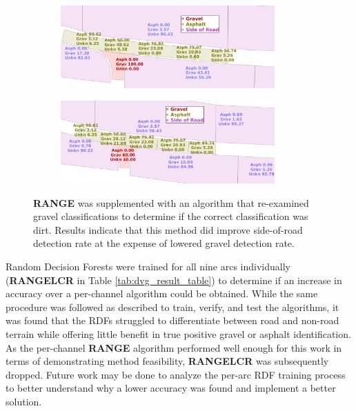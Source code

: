 \documentclass[numbered,pdftex]{ohio-etd}
\begin{document}
{{{%
		\begin{figure}[H]
			\centering
			\begin{subfigure}[b]{\textwidth}
				\centering
				\includegraphics[width=0.9\textwidth]{Defense_Images/range_actual_rm_db_4_area_score}
				\caption{}
				\label{fig:db_4_raw_range_2}
			\end{subfigure}
			\vspace{1cm} %
			\begin{subfigure}[b]{\textwidth}
				\centering
				\includegraphics[width=0.9\textwidth]{Defense_Images/dvg_example}
				\caption{}
				\label{fig:dvg_example}
			\end{subfigure}
			\caption[Complementary RDF Area Scores]{\textbf{RANGE} was supplemented with an algorithm that re-examined gravel classifications to determine if the correct classification was dirt. Results indicate that this method did improve side-of-road detection rate at the expense of lowered gravel detection rate. }
			\label{fig:area_score_comp}
		\end{figure}
	
		{Random Decision Forests were trained for all nine arcs individually (\textbf{RANGELCR} in Table \ref{tab:dvg_result_table}) to determine if an increase in accuracy over a per-channel algorithm could be obtained. While the same procedure was followed as described to train, verify, and test the algorithms, it was found that the RDFs struggled to differentiate between road and non-road terrain while offering little benefit in true positive gravel or asphalt identification. As the per-channel \textbf{RANGE} algorithm performed well enough for this work in terms of demonstrating method feasibility, \textbf{RANGELCR} was subsequently dropped. Future work may be done to analyze the per-arc RDF training process to better understand why a lower accuracy was found and implement a better solution.}
		
}}}
\end{document}
